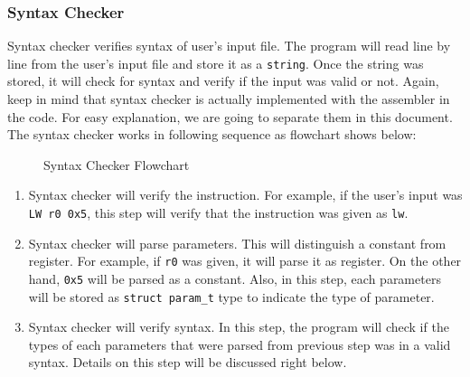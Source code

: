 \documentclass{homework}
\begin{document}
\subsubsection{Syntax Checker}
Syntax checker verifies syntax of user's input file. The program will read line by line from the user's input file and store it as a \texttt{string}. Once the string was stored, it will check for syntax and verify if the input was valid or not. Again, keep in mind that syntax checker is actually implemented with the assembler in the code. For easy explanation, we are going to separate them in this document. The syntax checker works in following sequence as flowchart shows below:

\begin{figure}[h]
\begin{center}
\caption{Syntax Checker Flowchart}
\end{center}
\end{figure}

\begin{enumerate}
    \item Syntax checker will verify the instruction. For example, if the user's input was \texttt{LW r0 0x5}, this step will verify that the instruction was given as \texttt{lw}. 
    \item Syntax checker will parse parameters. This will distinguish a constant from register. For example, if \texttt{r0} was given, it will parse it as register. On the other hand, \texttt{0x5} will be parsed as a constant. Also, in this step, each parameters will be stored as \texttt{struct param_t} type to indicate the type of parameter.
    \item Syntax checker will verify syntax. In this step, the program will check if the types of each parameters that were parsed from previous step was in a valid syntax. Details on this step will be discussed right below.
\end{enumerate}
\end{document}
